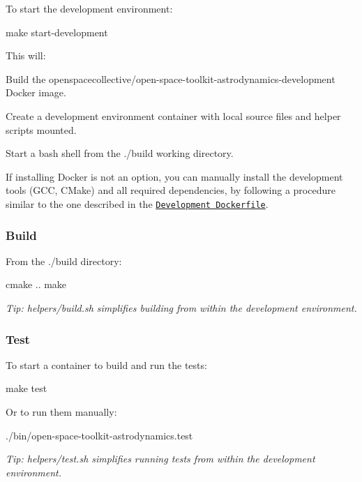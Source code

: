 To start the development environment\+:


\begin{DoxyCode}
make start-development
\end{DoxyCode}


This will\+:


\begin{DoxyEnumerate}
\item Build the {\ttfamily openspacecollective/open-\/space-\/toolkit-\/astrodynamics-\/development} Docker image.
\item Create a development environment container with local source files and helper scripts mounted.
\item Start a {\ttfamily bash} shell from the {\ttfamily ./build} working directory.
\end{DoxyEnumerate}

If installing Docker is not an option, you can manually install the development tools (G\+CC, C\+Make) and all required dependencies, by following a procedure similar to the one described in the \href{./docker/development/Dockerfile}{\tt Development Dockerfile}.

\subsubsection*{Build}

From the {\ttfamily ./build} directory\+:


\begin{DoxyCode}
cmake ..
make
\end{DoxyCode}


{\itshape Tip\+: {\ttfamily helpers/build.\+sh} simplifies building from within the development environment.}

\subsubsection*{Test}

To start a container to build and run the tests\+:


\begin{DoxyCode}
make test
\end{DoxyCode}


Or to run them manually\+:


\begin{DoxyCode}
./bin/open-space-toolkit-astrodynamics.test
\end{DoxyCode}


{\itshape Tip\+: {\ttfamily helpers/test.\+sh} simplifies running tests from within the development environment.}

